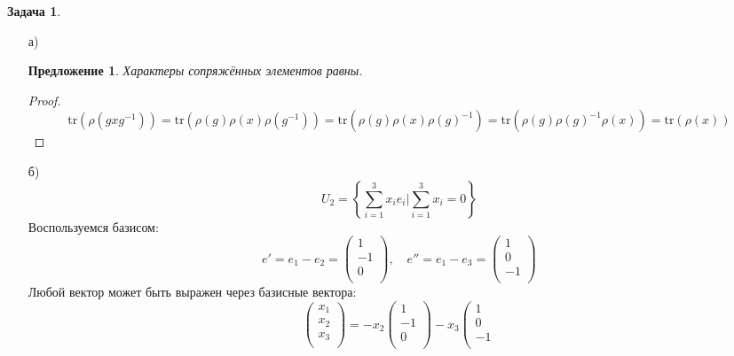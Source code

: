 \documentclass[12pt]{article}
\newtheorem{predl}[theorem]{Предложение}
\theoremstyle{definition}
\newtheorem{zad}{Задача}[section]
\begin{document}
\begin{zad}
\begin{itemize}
    \item[а)] 
    \begin{predl}
        Характеры сопряжённых элементов равны.
    \end{predl}
    \begin{proof}
        \begin{equation*}
            \text{tr}(\rho(gxg^{-1}))=\text{tr}(\rho(g)\rho(x)\rho(g^{-1}))=\text{tr}(\rho(g)\rho(x)\rho(g)^{-1})=\text{tr}(\rho(g)\rho(g)^{-1}\rho(x))=\text{tr}(\rho(x))
        \end{equation*}
    \end{proof}
    \item[б)]
    \begin{equation}
        U_2=\left\{\sum\limits_{i=1}^3x_ie_i|\sum_{i=1}^3x_i=0\right\}
    \end{equation}
    Воспользуемся базисом:
    \begin{equation}
        e'=e_1-e_2=\left(
    \begin{array}{c}
    1\\
    -1\\
    0\\
    \end{array}
    \right),\quad e''=e_1-e_3=\left(
    \begin{array}{c}
    1\\
    0\\
    -1\\
    \end{array}
    \right)
    \end{equation}
    Любой вектор может быть выражен через базисные вектора:
    \begin{equation}
        \left(
    \begin{array}{c}
    x_1\\
    x_2\\
    x_3\\
    \end{array}
    \right)=-x_2\left(
    \begin{array}{c}
    1\\
    -1\\
    0\\
    \end{array}
    \right)-x_3\left(
    \begin{array}{c}
    1\\
    0\\
    -1\\

\end{array}
\end{equation}
\end{itemize}
\end{zad}
\end{document}
